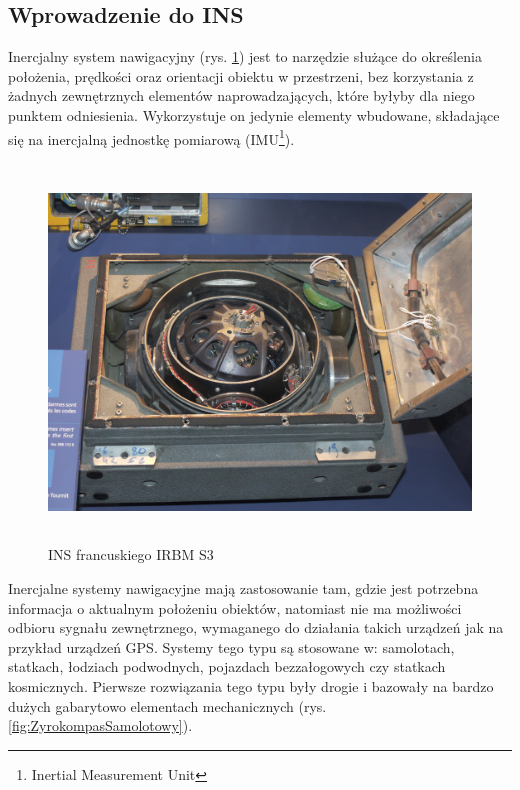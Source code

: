 \subsection{Wprowadzenie do INS}

Inercjalny system nawigacyjny (rys. \ref{fig:Zyrokompas}) jest to narzędzie
służące do określenia położenia, prędkości oraz orientacji obiektu w przestrzeni,
bez korzystania z żadnych zewnętrznych elementów naprowadzających, które byłyby
dla niego punktem odniesienia. Wykorzystuje on jedynie elementy wbudowane,
składające się na inercjalną jednostkę pomiarową (IMU\footnote{Inertial
Measurement Unit}). \begin{figure}[!ht]
 \centering \includegraphics[height=100mm]{../images/ch04/INS-zdjecie.jpg}
 \caption[INS francuskiego IRBM S3]{INS francuskiego IRBM S3\footnotemark}
 \label{fig:Zyrokompas}
\end{figure}

Inercjalne systemy nawigacyjne  mają zastosowanie tam, gdzie jest potrzebna
informacja o aktualnym położeniu obiektów, natomiast nie ma możliwości odbioru
sygnału zewnętrznego, wymaganego do działania takich urządzeń jak na przykład
urządzeń GPS. Systemy tego typu są stosowane w: samolotach, statkach, łodziach
podwodnych, pojazdach bezzałogowych czy statkach kosmicznych. Pierwsze
rozwiązania tego typu były drogie i bazowały na bardzo dużych gabarytowo
elementach mechanicznych (rys. \ref{fig:ZyrokompasSamolotowy}).

